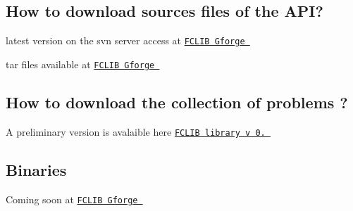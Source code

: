 \hypertarget{download_howtosources}{}\subsection{How to download sources files of the A\-P\-I?}\label{download_howtosources}

\begin{DoxyItemize}
\item latest version on the svn server access at \href{ https://gforge.inria.fr/scm/?group_id=2824}{\tt F\-C\-L\-I\-B Gforge } 
\item tar files available at \href{https://gforge.inria.fr/frs/?group_id=2824}{\tt F\-C\-L\-I\-B Gforge } 
\end{DoxyItemize}\hypertarget{download_howtolibrary}{}\subsection{How to download the collection of problems ?}\label{download_howtolibrary}

\begin{DoxyItemize}
\item A preliminary version is avalaible here \href{./resources/fclib-library-v0.1.tgz}{\tt F\-C\-L\-I\-B library v 0. } 
\end{DoxyItemize}\hypertarget{download_howto}{}\subsection{Binaries}\label{download_howto}

\begin{DoxyItemize}
\item Coming soon at \href{https://gforge.inria.fr/frs/?group_id=2824}{\tt F\-C\-L\-I\-B Gforge } 
\end{DoxyItemize}

\par
 \par
 